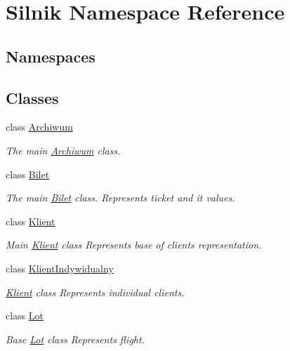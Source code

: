 \hypertarget{namespace_silnik}{}\section{Silnik Namespace Reference}
\label{namespace_silnik}
\subsection*{Namespaces}
\begin{DoxyCompactItemize}
\end{DoxyCompactItemize}
\subsection*{Classes}
\begin{DoxyCompactItemize}
\item 
class \mbox{\hyperlink{class_silnik_1_1_archiwum}{Archiwum}}
\begin{DoxyCompactList}\small\item\em The main \mbox{\hyperlink{class_silnik_1_1_archiwum}{Archiwum}} class. \end{DoxyCompactList}\item 
class \mbox{\hyperlink{class_silnik_1_1_bilet}{Bilet}}
\begin{DoxyCompactList}\small\item\em The main \mbox{\hyperlink{class_silnik_1_1_bilet}{Bilet}} class. Represents ticket and it values. \end{DoxyCompactList}\item 
class \mbox{\hyperlink{class_silnik_1_1_klient}{Klient}}
\begin{DoxyCompactList}\small\item\em Main \mbox{\hyperlink{class_silnik_1_1_klient}{Klient}} class Represents base of clients representation. \end{DoxyCompactList}\item 
class \mbox{\hyperlink{class_silnik_1_1_klient_indywidualny}{Klient\+Indywidualny}}
\begin{DoxyCompactList}\small\item\em \mbox{\hyperlink{class_silnik_1_1_klient}{Klient}} class Represents individual clients. \end{DoxyCompactList}\item 
class \mbox{\hyperlink{class_silnik_1_1_lot}{Lot}}
\begin{DoxyCompactList}\small\item\em Base \mbox{\hyperlink{class_silnik_1_1_lot}{Lot}} class Represents flight. \end{DoxyCompactList}\item 

\end{DoxyCompactItemize}
